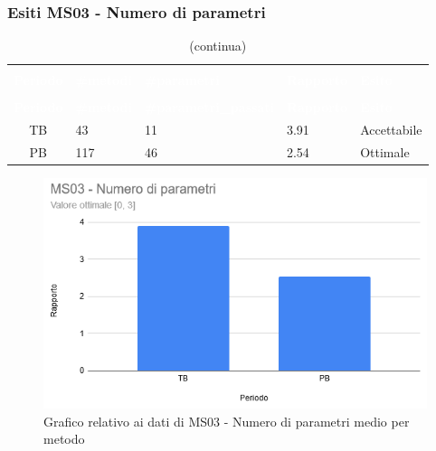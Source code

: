 \subsubsection{Esiti MS03 - Numero di parametri}
\begin{longtable}{c C{2cm} C{3cm} C{2cm} C{2.5cm}}
\caption{Esiti MS03 - Numero di parametri} \\
	\textcolor{white}{\textbf{Periodo}} &
	\textcolor{white}{\textbf{\#metodi}} &
	\textcolor{white}{\textbf{\#parametri}} &
\textcolor{white}{\textbf{Rapporto}} &
\textcolor{white}{\textbf{Esito}} \\
	\endfirsthead
		\caption[]{(continua)} \\
		\textcolor{white}{\textbf{Periodo}} &
	\textcolor{white}{\textbf{\#metodi}} &
	\textcolor{white}{\textbf{\#parametri\_passati}} &
\textcolor{white}{\textbf{Rapporto}} &
\textcolor{white}{\textbf{Esito}} \\
	\endhead
	TB & 43 & 11 & 3.91 & Accettabile \\
	PB & 117 & 46 & 2.54 & Ottimale \\
\end{longtable}

\begin{figure}[H]
\centering
\includegraphics[scale=0.7]{./img/MS03.png}
\caption{Grafico relativo ai dati di MS03 - Numero di parametri medio per metodo}
\end{figure}

